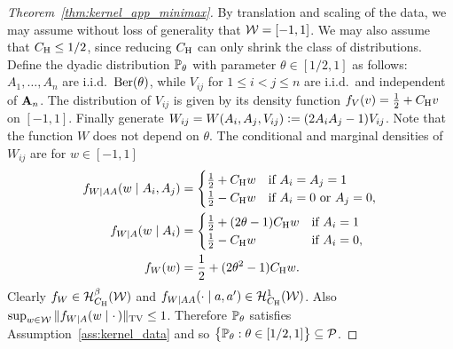 \begin{proof}[Theorem~\ref{thm:kernel_app_minimax}]


  By translation and scaling of the data,
  we may assume without loss of generality that $\cW = [-1,1]$.
  We may also assume that $\CH \leq 1/2$,
  since reducing $\CH$ can only shrink the class of distributions.
  Define the dyadic distribution $\P_\theta$
  with parameter $\theta \in [1/2, 1]$
  as follows:
  $A_1, \ldots, A_n$ are i.i.d.\ $\Ber(\theta)$, while
  $V_{i j}$ for $1 \leq i < j \leq n$ are i.i.d.\
  and independent of $\bA_n$.
  The distribution of $V_{i j}$ is given by its density function
  $f_V(v) = \frac{1}{2} + \CH v$ on $[-1,1]$.
  Finally generate
  $W_{i j} = W(A_i, A_j, V_{i j}) \vcentcolon=
  (2 A_i A_j - 1) V_{i j}$.
  Note that the function $W$ does not depend on $\theta$.
  The conditional and marginal densities of $W_{i j}$ are
  for $w \in [-1,1]$
  \begin{align*}
    f_{W \mid AA}(w \mid A_i, A_j)
    &=
    \begin{cases}
      \frac{1}{2} + \CH w & \text{if } A_i = A_j = 1                \\
      \frac{1}{2} - \CH w & \text{if } A_i = 0 \text{ or } A_j = 0, \\
    \end{cases} \\
    f_{W \mid A}(w \mid A_i)
    &=
    \begin{cases}
      \frac{1}{2} + (2 \theta - 1) \CH w
      & \text{if } A_i = 1   \\
      \frac{1}{2} - \CH w & \text{if } A_i = 0 , \\
    \end{cases} \\
    f_W(w)&= \frac{1}{2} + (2\theta^2 - 1) \CH w.
  \end{align*}
  Clearly
  $f_W \in \cH^\beta_{\CH}(\cW)$ and
  $f_{W \mid AA}(\cdot \mid a, a') \in \cH^1_{\CH}(\cW)$.
  Also
  $\sup_{w \in \cW} \|f_{W \mid A}(w \mid \cdot\,)\|_\TV \leq 1$.
  Therefore
  $\P_\theta$ satisfies Assumption~\ref{ass:kernel_data}
  and so
  $\big\{\P_\theta : \theta \in [1/2, 1] \big\} \subseteq \cP$.


\end{proof}
